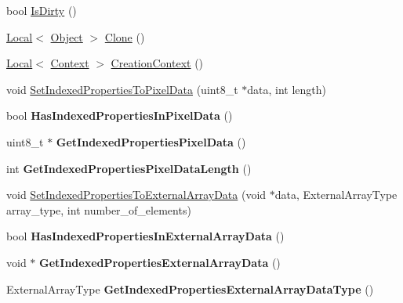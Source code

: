 \begin{DoxyCompactItemize}
\item 
bool \hyperlink{classv8_1_1_object_a3c1f8cfb754b5d29d5f1998b2047befd}{Is\+Dirty} ()
\item 
\hyperlink{classv8_1_1_local}{Local}$<$ \hyperlink{classv8_1_1_object}{Object} $>$ \hyperlink{classv8_1_1_object_a5018c9d085aa71f65530cf1e073a04ad}{Clone} ()
\item 
\hyperlink{classv8_1_1_local}{Local}$<$ \hyperlink{classv8_1_1_context}{Context} $>$ \hyperlink{classv8_1_1_object_af6966283a7d7e20779961eed434db04d}{Creation\+Context} ()
\item 
void \hyperlink{classv8_1_1_object_a6c552c4817b9a0eff1fb12b7ef089026}{Set\+Indexed\+Properties\+To\+Pixel\+Data} (uint8\+\_\+t $\ast$data, int length)
\item 
\hypertarget{classv8_1_1_object_a984cb47ed59b73d3d1b32f393a653cd4}{}bool {\bfseries Has\+Indexed\+Properties\+In\+Pixel\+Data} ()\label{classv8_1_1_object_a984cb47ed59b73d3d1b32f393a653cd4}

\item 
\hypertarget{classv8_1_1_object_af2cefd0bcc50b19bb23b93b493ceb3d2}{}uint8\+\_\+t $\ast$ {\bfseries Get\+Indexed\+Properties\+Pixel\+Data} ()\label{classv8_1_1_object_af2cefd0bcc50b19bb23b93b493ceb3d2}

\item 
\hypertarget{classv8_1_1_object_ac6af430db5a41a0c9b6cacb507d95e0d}{}int {\bfseries Get\+Indexed\+Properties\+Pixel\+Data\+Length} ()\label{classv8_1_1_object_ac6af430db5a41a0c9b6cacb507d95e0d}

\item 
void \hyperlink{classv8_1_1_object_a530f661dec20ce1a0a1b15a45195418c}{Set\+Indexed\+Properties\+To\+External\+Array\+Data} (void $\ast$data, External\+Array\+Type array\+\_\+type, int number\+\_\+of\+\_\+elements)
\item 
\hypertarget{classv8_1_1_object_ae3c884315aaba6d11d3663a8569fe8f1}{}bool {\bfseries Has\+Indexed\+Properties\+In\+External\+Array\+Data} ()\label{classv8_1_1_object_ae3c884315aaba6d11d3663a8569fe8f1}

\item 
\hypertarget{classv8_1_1_object_a7763a639b0ec6d35f645d0d2facfd8ce}{}void $\ast$ {\bfseries Get\+Indexed\+Properties\+External\+Array\+Data} ()\label{classv8_1_1_object_a7763a639b0ec6d35f645d0d2facfd8ce}

\item 
\hypertarget{classv8_1_1_object_a02e0652188d3a9c557b07ac2ba037b23}{}External\+Array\+Type {\bfseries Get\+Indexed\+Properties\+External\+Array\+Data\+Type} ()\label{classv8_1_1_object_a02e0652188d3a9c557b07ac2ba037b23}


\end{DoxyCompactItemize}
